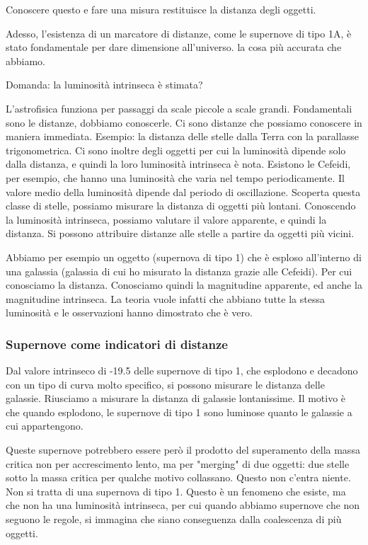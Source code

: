 Conoscere questo e fare una misura restituisce la distanza degli oggetti.

Adesso, l'esistenza di un marcatore di distanze, come le supernove di tipo 1A, è stato fondamentale per dare dimensione all'universo. \E la cosa più accurata che abbiamo.

\vspace{0.2cm}Domanda: la luminosità intrinseca è stimata?

L'astrofisica funziona per passaggi da scale piccole a scale grandi. Fondamentali sono le distanze, dobbiamo conoscerle. Ci sono distanze che possiamo conoscere in maniera immediata. Esempio: la distanza delle stelle dalla Terra con la parallasse trigonometrica. Ci sono inoltre degli oggetti per cui la luminosità dipende solo dalla distanza, e quindi la loro luminosità intrinseca è nota. Esistono le Cefeidi, per esempio, che hanno una luminosità che varia nel tempo periodicamente. Il valore medio della luminosità dipende dal periodo di oscillazione. Scoperta questa classe di stelle, possiamo misurare la distanza di oggetti più lontani. Conoscendo la luminosità intrinseca, possiamo valutare il valore apparente, e quindi la distanza. Si possono attribuire distanze alle stelle a partire da oggetti più vicini.

Abbiamo per esempio un oggetto (supernova di tipo 1) che è esploso all'interno di una galassia (galassia di cui ho misurato la distanza grazie alle Cefeidi). Per cui conosciamo la distanza. Conosciamo quindi la magnitudine apparente, ed anche la magnitudine intrinseca. La teoria vuole infatti che abbiano tutte la stessa luminosità e le osservazioni hanno dimostrato che è vero.

\subsubsection{Supernove come indicatori di distanze}
Dal valore intrinseco di -19.5 delle supernove di tipo 1, che esplodono e decadono con un tipo di curva molto specifico, si possono misurare le distanza delle galassie. Riusciamo a misurare la distanza di galassie lontanissime. Il motivo è che quando esplodono, le supernove di tipo 1 sono luminose quanto le galassie a cui appartengono.

Queste supernove potrebbero essere però il prodotto del superamento della massa critica non per accrescimento lento, ma per "merging" di due oggetti: due stelle sotto la massa critica per qualche motivo collassano. Questo non c'entra niente. Non si tratta di una supernova di tipo 1. Questo è un fenomeno che esiste, ma che non ha una luminosità intrinseca, per cui quando abbiamo supernove che non seguono le regole, si immagina che siano conseguenza dalla coalescenza di più oggetti.

